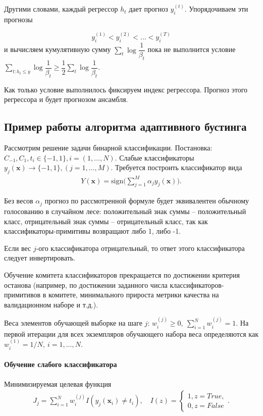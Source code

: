 \documentclass[%
	11pt,
	a4paper,
	utf8,
		]{article}
\begin{document}
Другими словами, каждый регрессор $ h_t $ дает прогноз $ y_i^{(t)} $. Упорядочиваем эти прогнозы

$$ y_i^{(1)} < y_i^{(2)} < \ldots < y_i^{(T)} $$
и вычисляем кумулятивную сумму $ \sum_t \log \dfrac{1}{\beta_t} $ пока не выполнится условие $ \sum_{t: h_t \leqslant y} \log \dfrac{1}{\beta_t} \geqslant \dfrac{1}{2} \sum_{t}  \log \dfrac{1}{\beta_t} $.

Как только условие выполнилось фиксируем индекс регрессора. Прогноз этого регрессора и будет прогнозом ансамбля.



\subsection{Пример работы алгоритма адаптивного бустинга}

Рассмотрим решение задачи бинарной классификации. Постановка: $ C_{-1}, C_1, t_i \in \{-1, 1\}, i = (1, \ldots, N) $. Слабые классификаторы $ y_j(\mathbf{x}) \rightarrow \{-1, 1\}, (j = 1,\ldots, M) $. Требуется построить классификатор вида
\begin{align*}
	Y(\mathbf{x}) = \text{sign} \Big(\sum_{j=1}^{M} \alpha_j y_j(\mathbf{x})\Big).
\end{align*}

Без весов $ \alpha_j $ прогноз по рассмотренной формуле будет эквивалентен обычному голосованию в случайном лесе: положительный знак суммы -- положительный класс, отрицательный знак суммы -- отрицательный класс, так как классификаторы-примитивы возвращают либо 1, либо -1.

Если вес $ j $-ого классификатора отрицательный, то ответ этого классификатора следует инвертировать.

Обучение комитета классификаторов прекращается по достижении критерия останова (например, по достижении заданного числа классификаторов-примитивов в комитете, минимального прироста метрики качества на валидационном наборе и т.д.).

Веса элементов обучающей выборке на шаге $ j $: $ w_i^{(j)} \geqslant 0,\ \sum\limits_{i=1}^N w_i^{(j)} = 1 $. На первой итерации для всех экземпляров обучающего набора веса определяются как $ w_i^{(1)} = 1/N,\ i = 1, \ldots, N $.

\paragraph{Обучение слабого классификатора} Минимизируемая целевая функция
\begin{align*}
	J_j = \sum_{i=1}^{N} w_i^{(j)} I(y_j(\mathbf{x}_i) \neq t_i), \quad I(z) =
	\begin{cases}
		1, z=True,\\
		0, z=False
	\end{cases}.
\end{align*} 
\end{document}
